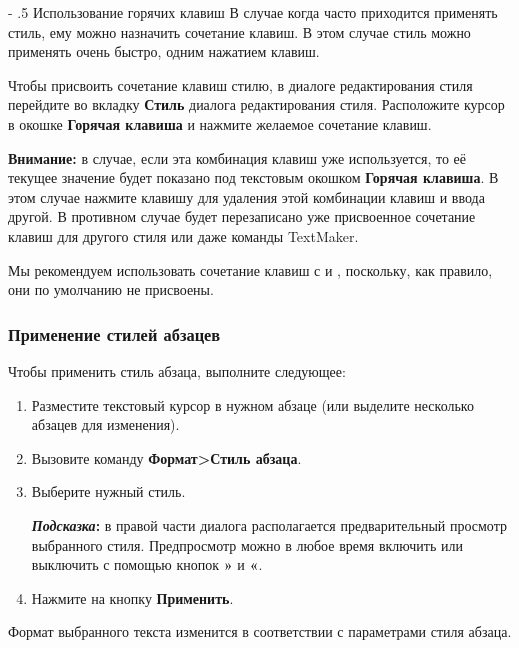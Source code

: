 \documentclass[a4paper,10pt]{article}
\makeatletter
\renewcommand\paragraph{%
   \@startsection{paragraph}{4}{0mm}%
      {-\baselineskip}%
      {.5\baselineskip}%
      {\normalfont\normalsize\bfseries}}
\makeatother
\begin{document}
\paragraph{Использование горячих клавиш}
В случае когда часто приходится применять стиль, ему можно назначить сочетание клавиш. В этом случае стиль можно применять очень быстро, одним нажатием клавиш.

Чтобы присвоить сочетание клавиш стилю, в диалоге редактирования стиля перейдите во вкладку \textbf{Стиль} диалога редактирования стиля. Расположите курсор в окошке \textbf{Горячая клавиша} и нажмите желаемое сочетание клавиш.

\begin{mdframed}[backgroundcolor=blue!10]
\textbf{Внимание:} в случае, если эта комбинация клавиш уже используется, то её текущее значение будет показано под текстовым окошком \textbf{Горячая клавиша}. В этом случае нажмите клавишу  для удаления этой комбинации клавиш и ввода другой. В противном случае будет перезаписано уже присвоенное сочетание клавиш для другого стиля или даже команды TextMaker.
\end{mdframed}

Мы рекомендуем использовать сочетание клавиш с  и , поскольку, как правило, они по умолчанию не присвоены.

\subsubsection{Применение стилей абзацев}

Чтобы применить стиль абзаца, выполните следующее:
\begin{enumerate}
 \item Разместите текстовый курсор в нужном абзаце (или выделите несколько абзацев для изменения).
 \item Вызовите команду \textbf{Формат>Стиль абзаца}.
 \item Выберите нужный стиль.
 \begin{mdframed}[backgroundcolor=blue!10]
\textbf{\textit{Подсказка}:} в правой части диалога располагается предварительный просмотр выбранного стиля. Предпросмотр можно в любое время включить или выключить с помощью кнопок \textbf{»} и \textbf{«}.
\end{mdframed}
\item Нажмите на кнопку \textbf{Применить}.
\end{enumerate}

Формат выбранного текста изменится в соответствии с параметрами стиля абзаца.
\end{document}
